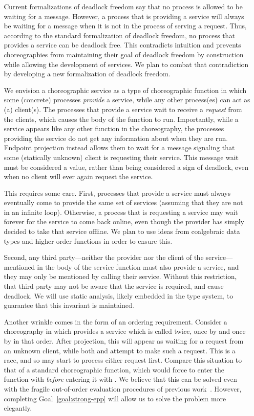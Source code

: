 Current formalizations of deadlock freedom say that no process is allowed to be waiting for a message.
However, a process that is providing a service will always be waiting for a message when it is not in the process of serving a request.
Thus, according to the standard formalization of deadlock freedom, no process that provides a service can be deadlock free.
This contradicts intuition and prevents choreographies from maintaining their goal of deadlock freedom by construction while allowing the development of services.
We plan to combat that contradiction by developing a new formalization of deadlock freedom.

We envision a choreographic service as a type of choreographic function in which some (concrete) processes \emph{provide} a service, while any other process(es) can act as (a) client(s).
The processes that provide a service wait to receive a \emph{request} from the clients, which causes the body of the function to run.
Importantly, while a service appears like any other function in the choreography, the processes providing the service do not get any information about when they are run.
Endpoint projection instead allows them to wait for a message signaling that some (statically unknown) client is requesting their service.
This message wait must be considered a value, rather than being considered a sign of deadlock, even when no client will ever again request the service.

This requires some care.
First, processes that provide a service must always eventually come to provide the same set of services (assuming that they are not in an infinite loop).
Otherwise, a process that is requesting a service may wait forever for the service to come back online, even though the provider has simply decided to take that service offline.
We plan to use ideas from coalgebraic data types and higher-order functions in order to ensure this.

Second, any third party---neither the provider nor the client of the service---mentioned in the body of the service function must also provide a service, and they may only be mentioned by calling their service.
Without this restriction, that third party may not be aware that the service is required, and cause deadlock.
We will use static analysis, likely embedded in the type system, to guarantee that this invariant is maintained.

Another wrinkle comes in the form of an ordering requirement.
Consider a choreography in which \Alice{} provides a service which is called twice, once by \Bob{} and once by \Cathy{} in that order.
After projection, this will appear as \Alice{} waiting for a request from an unknown client, while both \Bob{} and \Cathy{} attempt to make such a request.
This is a race, and so \Alice{} may start to process either request first.
Compare this situation to that of a standard choreographic function, which would force \Alice{} to enter the function with \Bob{} \emph{before} entering it with \Cathy{}.
We believe that this can be solved even with the fragile out-of-order evaluation procedures of previous work~\cite{CruzFilipeGLMP23,Montesi23,HirschG22}.
However, completing Goal~\ref{goal:strong-epp} will allow us to solve the problem more elegantly.

